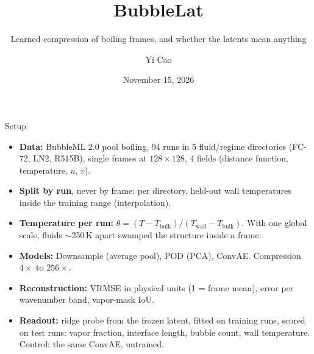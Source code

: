 \documentclass[aspectratio=169,11pt]{beamer}
\title{BubbleLat}
\subtitle{Learned compression of boiling frames, and whether the latents mean anything}
\author{Yi Cao}
\institute{EECS 221 check-in}
\date{November 15, 2026}
\begin{document}
\begin{frame}
  \titlepage
\end{frame}

\begin{frame}{Setup}
  \begin{itemize}
    \item \textbf{Data:} BubbleML 2.0 pool boiling, 94 runs in 5 fluid/regime directories
      (FC-72, LN2, R515B), single frames at $128\times128$, 4 fields
      (distance function, temperature, $u$, $v$).
    \item \textbf{Split by run}, never by frame: per directory, held-out wall temperatures
      inside the training range (interpolation).
    \item \textbf{Temperature per run:} $\theta = (T - T_\mathrm{bulk})/(T_\mathrm{wall} - T_\mathrm{bulk})$.
      With one global scale, fluids $\sim$250\,K apart swamped the structure inside a frame.
    \item \textbf{Models:} Downsample (average pool), POD (PCA), ConvAE.
      Compression $4\times$ to $256\times$.
    \item \textbf{Reconstruction:} VRMSE in physical units (1 = frame mean), error per
      wavenumber band, vapor-mask IoU.
    \item \textbf{Readout:} ridge probe from the frozen latent, fitted on training runs,
      scored on test runs: vapor fraction, interface length, bubble count, wall temperature.
      Control: the same ConvAE, untrained.
  \end{itemize}
\end{frame}
\end{document}

